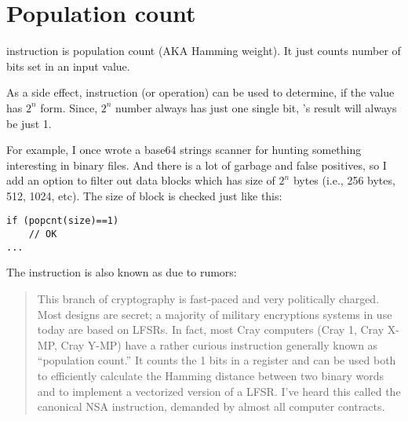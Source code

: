 \section{Population count}
\label{POPCNT}

 instruction is population count (AKA Hamming weight).
It just counts number of bits set in an input value.

As a side effect,  instruction (or operation) can be used to determine, if the value has $2^n$ form.
Since, $2^n$ number always has just one single bit, 's result will always be just 1.

For example, I once wrote a base64 strings scanner for hunting something interesting in binary files. %
And there is a lot of garbage and false positives, so I add an option to filter out data blocks which has size of $2^n$ bytes
(i.e., 256 bytes, 512, 1024, etc).
The size of block is checked just like this:

\begin{lstlisting}
if (popcnt(size)==1)
	// OK
...
\end{lstlisting}

The instruction is also known as  due to rumors:

\begin{framed}
\begin{quotation}
  This branch of cryptography is fast-paced and very politically charged.
  Most designs are secret; a majority of military encryptions systems in use today are 
  based on LFSRs. 
  In fact, most Cray computers (Cray 1, Cray X-MP, Cray Y-MP) have a rather curious 
  instruction generally known as “population count.” It counts the 1 bits in a register 
  and can be used both to efficiently calculate the Hamming distance between two binary 
  words and to implement a vectorized version of a LFSR. I’ve heard this called the canonical 
  NSA instruction, demanded by almost all computer contracts.
\end{quotation}
\end{framed}
\InSqBrackets{\Schneier{}}

